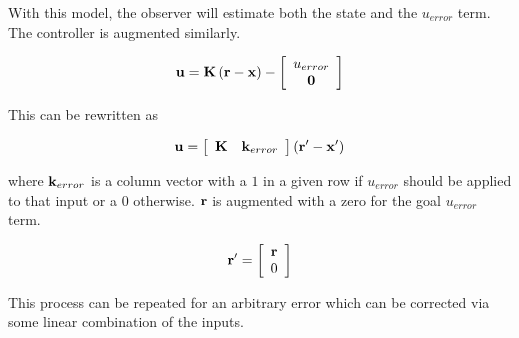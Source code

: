 \noindent With this model, the observer will estimate both the state and the
$u_{error}$ term. The controller is augmented similarly.

\begin{equation*}
  \mathbf{u} = \mathbf{K} \left(\mathbf{r} - \mathbf{x}\right) - \left[
  \begin{array}{c}
    u_{error} \\
    \mathbf{0}
  \end{array}
  \right]
\end{equation*}

\noindent This can be rewritten as

\begin{equation*}
  \mathbf{u} = \left[
  \begin{array}{cc}
    \mathbf{K} & \mathbf{k}_{error}
  \end{array}
  \right] \left(\mathbf{r}' - \mathbf{x}'\right)
\end{equation*}

\noindent where $\mathbf{k}_{error}$ is a column vector with a $1$ in a given row
if $u_{error}$ should be applied to that input or a $0$ otherwise. $\mathbf{r}$ is
augmented with a zero for the goal $u_{error}$ term.

\begin{equation*}
  \mathbf{r}' = \left[
  \begin{array}{c}
    \mathbf{r} \\
    0
  \end{array}
  \right]
\end{equation*}

This process can be repeated for an arbitrary error which can be corrected via
some linear combination of the inputs.
